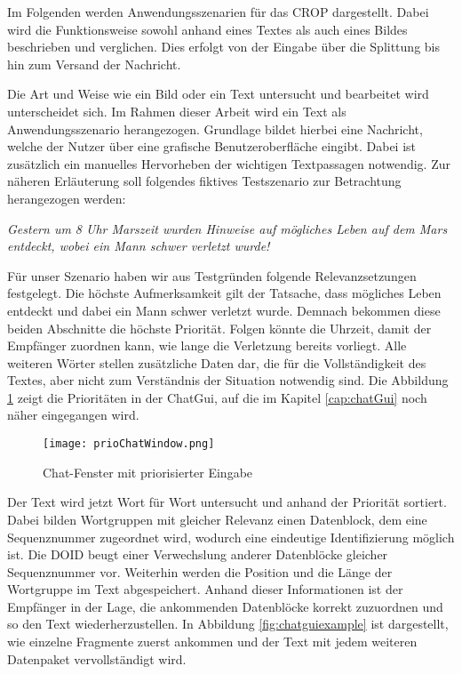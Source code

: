 \label{sec:Anwendungsszenarien}

Im Folgenden werden Anwendungsszenarien für das \gls{CROP} dargestellt. Dabei
wird die Funktionsweise sowohl anhand eines Textes als auch eines Bildes beschrieben und
verglichen. Dies erfolgt von der Eingabe über die Splittung bis hin zum Versand
der Nachricht.

Die Art und Weise wie ein Bild oder ein Text untersucht und bearbeitet wird
unterscheidet sich. Im Rahmen dieser Arbeit wird ein Text als
Anwendungsszenario herangezogen. Grundlage bildet hierbei eine Nachricht,
welche der Nutzer über eine grafische Benutzeroberfläche eingibt.
Dabei ist zusätzlich ein manuelles Hervorheben der wichtigen Textpassagen
notwendig. Zur näheren Erläuterung soll folgendes fiktives Testszenario zur
Betrachtung herangezogen werden:

\textit{\glqq Gestern um 8 Uhr Marszeit wurden Hinweise auf mögliches Leben auf
dem Mars entdeckt, wobei ein Mann schwer verletzt wurde! \grqq}

Für unser Szenario haben wir aus Testgründen folgende Relevanzsetzungen
festgelegt. Die höchste Aufmerksamkeit gilt der Tatsache, dass mögliches Leben
entdeckt und dabei ein Mann schwer verletzt wurde. Demnach bekommen diese beiden
Abschnitte die höchste Priorität. Folgen könnte die Uhrzeit, damit der Empfänger
zuordnen kann, wie lange die Verletzung bereits vorliegt. Alle weiteren Wörter
stellen zusätzliche Daten dar, die für die Vollständigkeit des Textes, aber
nicht zum Verständnis der Situation notwendig sind. Die Abbildung
\ref{fig:prioChatWindow} zeigt die Prioritäten in der ChatGui, auf die im
Kapitel \ref{cap:chatGui} noch näher eingegangen wird.

\begin{figure}[H]
	\centering
	\texttt{[image: prioChatWindow.png]}
	\label{fig:prioChatWindow}
	\caption{Chat-Fenster mit priorisierter Eingabe}
\end{figure}

Der Text wird jetzt Wort für Wort untersucht und anhand der Priorität sortiert.
Dabei bilden Wortgruppen mit gleicher Relevanz einen Datenblock, dem eine
Sequenznummer zugeordnet wird, wodurch eine eindeutige Identifizierung möglich
ist. Die \gls{DOID} beugt einer Verwechslung anderer Datenblöcke gleicher
Sequenznummer vor. Weiterhin werden die Position und die Länge der Wortgruppe im
Text abgespeichert. Anhand dieser Informationen ist der Empfänger in der Lage,
die ankommenden Datenblöcke korrekt zuzuordnen und so den Text
wiederherzustellen.
In Abbildung \ref{fig:chatguiexample} ist dargestellt, wie einzelne Fragmente
zuerst ankommen und der Text mit jedem weiteren Datenpaket vervollständigt wird.

